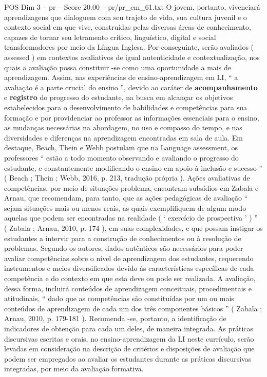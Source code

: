 \begin{textsample}{POS Dim 3 – pr – Score 20.00 – pr/pr\_em\_61.txt}
O jovem, portanto, vivenciará aprendizagens que dialoguem com seu trajeto de vida, sua cultura juvenil e o contexto social em que vive, construídas pelas diversas áreas de conhecimento, capazes de tornar seu letramento crítico, linguístico, digital e social transformadores por meio da Língua Inglesa.
Por conseguinte, serão avaliados ( assessed ) em contextos avaliativos de igual autenticidade e contextualização, nos quais a avaliação possa constituir -se como uma oportunidade a mais de aprendizagem.
Assim, nas experiências de ensino-aprendizagem em LI, “ a avaliação é a parte crucial do ensino ”, devido ao caráter de \textbf{acompanhamento} e \textbf{registro} do progresso do estudante, na busca em alcançar os objetivos estabelecidos para o desenvolvimento de habilidades e competências para sua formação e por providenciar ao professor as informações essenciais para o ensino, as mudanças necessárias na abordagem, no uso e compasso do tempo, e nas diversidades e diferenças na aprendizagem encontradas em sala de aula.
Em destaque, Beach, Thein e Webb postulam que na Language assessment, os professores “ estão a todo momento observando e avaliando o progresso do estudante, e constantemente modificando o ensino em apoio à inclusão e sucesso ” ( Beach ; Thein ; Webb, 2016, p. 213, tradução própria ).
Ações avaliativas de competências, por meio de situações-problema, encontram subsídios em Zabala e Arnau, que recomendam, para tanto, que as ações pedagógicas de avaliação “ sejam situações mais ou menos reais, as quais exemplifiquem de algum modo aquelas que podem ser encontradas na realidade ( ‘ exercício de prospectiva ’ ) ” ( Zabala ; Arnau, 2010, p. 174 ), em suas complexidades, e que possam instigar os estudantes a intervir para a construção de conhecimentos ou à resolução de problemas.
Segundo os autores, dados autênticos são necessários para poder avaliar competências sobre o nível de aprendizagem dos estudantes, requerendo instrumentos e meios diversificados devido às características específicas de cada competência e do contexto em que esta deve ou pode ser realizada.
A avaliação, dessa forma, incluirá conteúdos de aprendizagem conceituais, procedimentais e atitudinais, “ dado que as competências são constituídas por um ou mais conteúdos de aprendizagem de cada um dos três componentes básicos ” ( Zabala ; Arnau, 2010, p. 179-181 ).
Recomenda -se, portanto, a identificação de indicadores de obtenção para cada um deles, de maneira integrada.
As práticas discursivas escritas e orais, no ensino-aprendizagem da LI neste currículo, serão levadas em consideração na descrição de critérios e disposições de avaliação que podem ser empregados ao avaliar os estudantes durante as práticas discursivas integradas, por meio da avaliação formativa.

\end{textsample}
